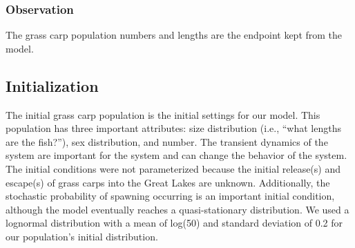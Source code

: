 \documentclass{article}[12pt]
\begin{document}

\subsubsection{Observation}

The grass carp population numbers and lengths are the endpoint kept from the model.  


\subsection{Initialization}\label{sec:init}

The initial grass carp population is the initial settings for our model.
This population has three important attributes: size distribution (i.e., ``what lengths are the fish?''), sex distribution, and number.
The transient dynamics of the system are important for the system and can change the behavior of the system.
The initial conditions were not parameterized because the initial release(s) and escape(s) of grass carps into the Great Lakes are unknown. 
Additionally, the stochastic probability of spawning occurring is an important initial condition, although the model eventually reaches a quasi-stationary distribution.  
We used a lognormal distribution with a mean of log(50) and standard deviation of 0.2 for our population's initial distribution. 


\end{document}
